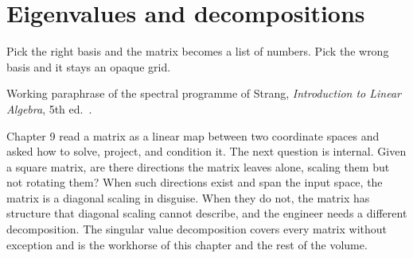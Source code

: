 \chapter{Eigenvalues and decompositions}
\label{vol02:ch10}


\epigraph{Pick the right basis and the matrix becomes a list of
numbers. Pick the wrong basis and it stays an opaque grid.}{Working
paraphrase of the spectral programme of Strang,
\emph{Introduction to Linear Algebra}, 5th ed.\
\cite[ch.~6]{text:strang2016}.}


\noindent
Chapter 9 read a matrix as a linear map between two coordinate
spaces and asked how to solve, project, and condition it. The next
question is internal. Given a square matrix, are there directions
the matrix leaves alone, scaling them but not rotating them? When
such directions exist and span the input space, the matrix is a
diagonal scaling in disguise. When they do not, the matrix has
structure that diagonal scaling cannot describe, and the engineer
needs a different decomposition. The singular value decomposition
covers every matrix without exception and is the workhorse of this
chapter and the rest of the volume.

